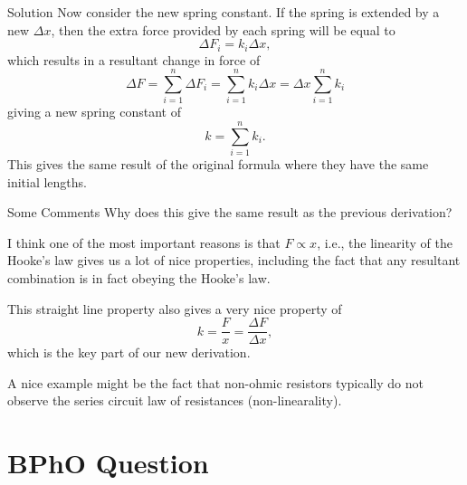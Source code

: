 \documentclass{beamer}
\begin{document}
    \begin{frame}{Solution}
        Now consider the new spring constant. If the spring is extended by a new \(\Delta x\), then the extra force provided by each spring will be equal to
        \[
            \Delta F_i = k_i \Delta x,
        \]
        which results in a resultant change in force of
        \[
            \Delta F = \sum_{i = 1}^{n} \Delta F_i = \sum_{i = 1}^{n} k_i \Delta x = \Delta x \sum_{i = 1}^{n} k_i
        \]
        giving a new spring constant of
        \[
            k = \sum_{i = 1}^{n} k_i.
        \]
        \pause
        This gives the same result of the original formula where they have the same initial lengths.
    \end{frame}

    \begin{frame}{Some Comments}
        Why does this give the same result as the previous derivation?\pause

        I think one of the most important reasons is that \(F \propto x\), i.e., the linearity of the Hooke's law gives us a lot of nice properties, including the fact that any resultant combination is in fact obeying the Hooke's law.
        \pause
        
        This straight line property also gives a very nice property of
        \[
            k = \frac{F}{x} = \frac{\Delta F}{\Delta x},
        \]
        which is the key part of our new derivation.
        \pause

        A nice example might be the fact that non-ohmic resistors typically do not observe the series circuit law of resistances (non-linearality).
    \end{frame}

    \section{BPhO Question}
\end{document}
